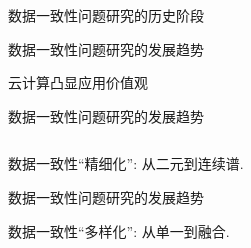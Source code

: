 \begin{frame}{数据一致性问题研究的历史阶段}
\end{frame}
\begin{frame}{数据一致性问题研究的发展趋势}
  \begin{center}
	云计算凸显应用价值观
  \end{center}

\end{frame}
\begin{frame}{数据一致性问题研究的发展趋势}
  \begin{columns}
  \end{columns}

  \vspace{0.50cm} 
  \begin{center}
	数据一致性``精细化'': 从二元到连续谱.
  \end{center}
\end{frame}
\begin{frame}{数据一致性问题研究的发展趋势}

  \vspace{0.50cm} 
  \begin{center}
	数据一致性``多样化'': 从单一到融合.
  \end{center}
\end{frame}
